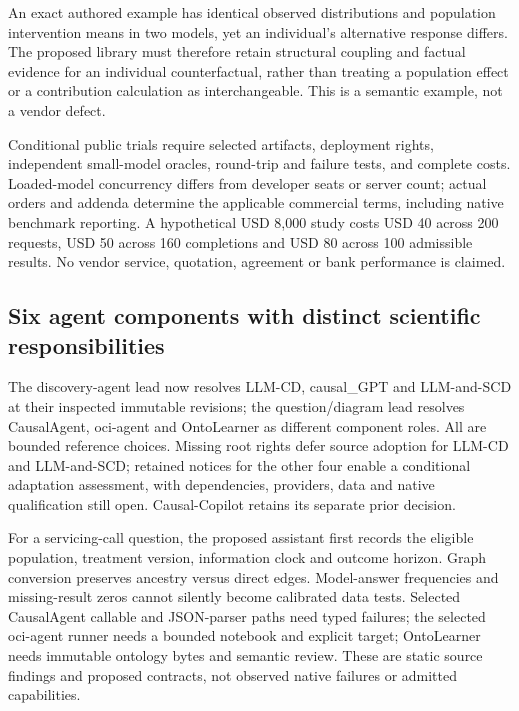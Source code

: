 An exact authored example has identical observed distributions and
population intervention means in two models, yet an individual's
alternative response differs. The proposed library must therefore retain
structural coupling and factual evidence for an individual
counterfactual, rather than treating a population effect or a
contribution calculation as interchangeable. This is a semantic example,
not a vendor defect.
\citep{exec13_ci_bayesia_counterfactual,exec25_bn_commercial_choice}

Conditional public trials require selected artifacts, deployment rights,
independent small-model oracles, round-trip and failure tests, and
complete costs. Loaded-model concurrency differs from developer seats or
server count; actual orders and addenda determine the applicable
commercial terms, including native benchmark reporting. A hypothetical
USD 8,000 study costs USD 40 across 200 requests, USD 50 across 160
completions and USD 80 across 100 admissible results. No vendor service,
quotation, agreement or bank performance is claimed.
\citep{exec13_bayesia_api,exec14_ci_purchase,exec14_ci_eula,exec25_bn_commercial_choice}

\hypertarget{six-agent-components-with-distinct-scientific-responsibilities}{%
\subsection{Six agent components with distinct scientific
responsibilities}\label{six-agent-components-with-distinct-scientific-responsibilities}}

The discovery-agent lead now resolves LLM-CD, causal\_GPT and
LLM-and-SCD at their inspected immutable revisions; the question/diagram
lead resolves CausalAgent, oci-agent and OntoLearner as different
component roles. All are bounded reference choices. Missing root rights
defer source adoption for LLM-CD and LLM-and-SCD; retained notices for
the other four enable a conditional adaptation assessment, with
dependencies, providers, data and native qualification still open.
Causal-Copilot retains its separate prior
decision.\citep{exec14_iid_cd,exec14_iid_gpt,exec14_iid_scd,exec13_data_causalagent_code,exec13_data_oci_code,exec13_data_ontolearner_code,exec25_agents_choice}

For a servicing-call question, the proposed assistant first records the
eligible population, treatment version, information clock and outcome
horizon. Graph conversion preserves ancestry versus direct edges.
Model-answer frequencies and missing-result zeros cannot silently become
calibrated data tests. Selected CausalAgent callable and JSON-parser
paths need typed failures; the selected oci-agent runner needs a bounded
notebook and explicit target; OntoLearner needs immutable ontology bytes
and semantic review. These are static source findings and proposed
contracts, not observed native failures or admitted
capabilities.\citep{exec14_iid_cd,exec14_iid_gpt,exec14_iid_scd,exec13_data_causalagent_code,exec13_data_oci_code,exec13_data_ontolearner_code,exec25_agents_choice}

